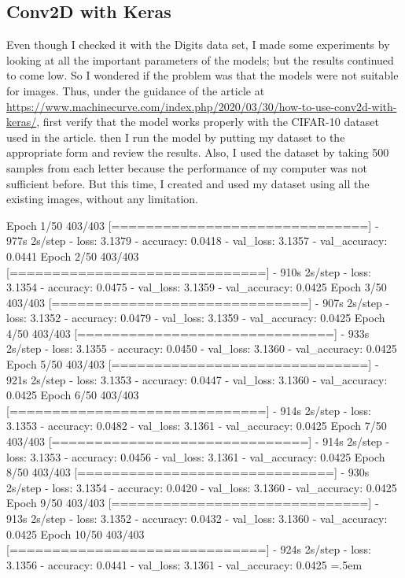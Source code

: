 \documentclass{article}
\newenvironment{lcverbatim}
 {\SaveVerbatim{cverb}}
 {\endSaveVerbatim
  \flushleft\fboxrule=0pt\fboxsep=.5em
  \colorbox{cverbbg}{%
    \makebox[\dimexpr\linewidth-2\fboxsep][l]{\BUseVerbatim{cverb}}%
  }
  \endflushleft
}
\begin{document}
\begin{flushleft}
\section{Conv2D with Keras}
\label{conv2d}
Even though I checked it with the Digits data set, I made some experiments by looking at all the important parameters of the models; but the results continued to come low. So I wondered if the problem was that the models were not suitable for images. Thus, under the guidance of the article at \hyperlink{https://www.machinecurve.com/index.php/2020/03/30/how-to-use-conv2d-with-keras/}{https://www.machinecurve.com/index.php/2020/03/30/how-to-use-conv2d-with-keras/}, first verify that the model works properly with the CIFAR-10 dataset used in the article. then I run the model by putting my dataset to the appropriate form and review the results. Also, I used the dataset by taking 500 samples from each letter because the performance of my computer was not sufficient before. But this time, I created and used my dataset using all the existing images, without any limitation.

\begin{lcverbatim}
Epoch 1/50 403/403 [==============================] - 977s 2s/step - 
    loss: 3.1379 - accuracy: 0.0418 - val_loss: 3.1357 - val_accuracy: 0.0441
Epoch 2/50 403/403 [==============================] - 910s 2s/step - 
    loss: 3.1354 - accuracy: 0.0475 - val_loss: 3.1359 - val_accuracy: 0.0425
Epoch 3/50 403/403 [==============================] - 907s 2s/step - 
    loss: 3.1352 - accuracy: 0.0479 - val_loss: 3.1359 - val_accuracy: 0.0425
Epoch 4/50 403/403 [==============================] - 933s 2s/step - 
    loss: 3.1355 - accuracy: 0.0450 - val_loss: 3.1360 - val_accuracy: 0.0425
Epoch 5/50 403/403 [==============================] - 921s 2s/step - 
    loss: 3.1353 - accuracy: 0.0447 - val_loss: 3.1360 - val_accuracy: 0.0425
Epoch 6/50 403/403 [==============================] - 914s 2s/step - 
    loss: 3.1353 - accuracy: 0.0482 - val_loss: 3.1361 - val_accuracy: 0.0425
Epoch 7/50 403/403 [==============================] - 914s 2s/step - 
    loss: 3.1353 - accuracy: 0.0456 - val_loss: 3.1361 - val_accuracy: 0.0425
Epoch 8/50 403/403 [==============================] - 930s 2s/step - 
    loss: 3.1354 - accuracy: 0.0420 - val_loss: 3.1360 - val_accuracy: 0.0425
Epoch 9/50 403/403 [==============================] - 913s 2s/step - 
    loss: 3.1352 - accuracy: 0.0432 - val_loss: 3.1360 - val_accuracy: 0.0425
Epoch 10/50 403/403 [==============================] - 924s 2s/step - 
    loss: 3.1356 - accuracy: 0.0441 - val_loss: 3.1361 - val_accuracy: 0.0425
\end{lcverbatim}


\end{flushleft}
\end{document}
